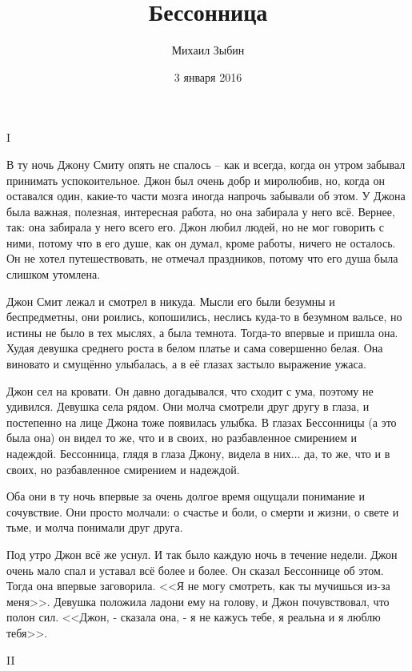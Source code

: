 \documentclass{article}
\begin{document}
\title{Бессонница}
\author{Михаил Зыбин}
\date{3 января 2016}
\maketitle

\begin{center}
I
\end{center}

В ту ночь Джону Смиту опять не спалось – как и всегда, когда он утром забывал принимать успокоительное. Джон был очень добр и миролюбив, но, когда он оставался один, какие-то части мозга иногда напрочь забывали об этом. У Джона была важная, полезная, интересная работа, но она забирала у него всё. Вернее, так: она забирала у него всего его. Джон любил людей, но не мог говорить с ними, потому что в его душе, как он думал, кроме работы, ничего не осталось. Он не хотел путешествовать, не отмечал праздников, потому что его душа была слишком утомлена.

Джон Смит лежал и смотрел в никуда. Мысли его были безумны и беспредметны, они роились, копошились, неслись куда-то в безумном вальсе, но истины не было в тех мыслях, а была темнота. Тогда-то впервые и пришла она. Худая девушка среднего роста в белом платье и сама совершенно белая. Она виновато и смущённо улыбалась, а в её глазах застыло выражение ужаса. 

Джон сел на кровати. Он давно догадывался, что сходит с ума, поэтому не удивился. Девушка села рядом. Они молча смотрели друг другу в глаза, и постепенно на лице Джона тоже появилась улыбка. В глазах Бессонницы (а это была она) он видел то же, что и в своих, но разбавленное смирением и надеждой. Бессонница, глядя в глаза Джону, видела в них$ \ldots $ да, то же, что и в своих, но разбавленное смирением и надеждой. 

Оба они в ту ночь впервые за очень долгое время ощущали понимание и сочувствие. Они просто молчали: о счастье и боли, о смерти и жизни, о свете и тьме, и молча понимали друг друга.

Под утро Джон всё же уснул. И так было каждую ночь в течение недели. Джон очень мало спал и уставал всё более и более. Он сказал Бессоннице об этом. Тогда она впервые заговорила. <<Я не могу смотреть, как ты мучишься из-за меня>>. Девушка положила ладони ему на голову, и Джон почувствовал, что полон сил. <<Джон, -  сказала она, - я не кажусь тебе, я реальна и я люблю тебя>>.

\newpage

\begin{center}
II
\end{center}
\end{document}
